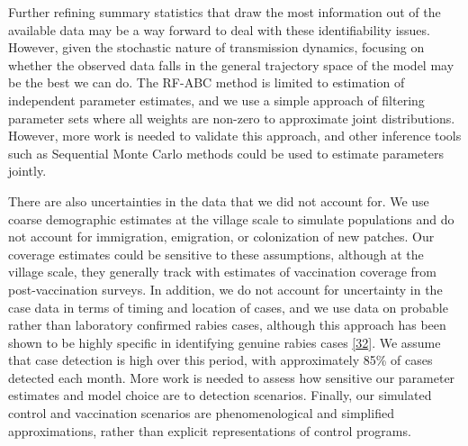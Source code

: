 \documentclass[
  oneside]{book}
\begin{document}
Further refining summary statistics that draw the most information out of the available data may be a way forward to deal with these identifiability issues. However, given the stochastic nature of transmission dynamics, focusing on whether the observed data falls in the general trajectory space of the model may be the best we can do. The RF-ABC method is limited to estimation of independent parameter estimates, and we use a simple approach of filtering parameter sets where all weights are non-zero to approximate joint distributions. However, more work is needed to validate this approach, and other inference tools such as Sequential Monte Carlo methods could be used to estimate parameters jointly.

There are also uncertainties in the data that we did not account for. We use coarse demographic estimates at the village scale to simulate populations and do not account for immigration, emigration, or colonization of new patches. Our coverage estimates could be sensitive to these assumptions, although at the village scale, they generally track with estimates of vaccination coverage from post-vaccination surveys. In addition, we do not account for uncertainty in the case data in terms of timing and location of cases, and we use data on probable rather than laboratory confirmed rabies cases, although this approach has been shown to be highly specific in identifying genuine rabies cases \protect\hyperlink{ref-Hampson2009}{{[}32{]}}. We assume that case detection is high over this period, with approximately 85\% of cases detected each month. More work is needed to assess how sensitive our parameter estimates and model choice are to detection scenarios. Finally, our simulated control and vaccination scenarios are phenomenological and simplified approximations, rather than explicit representations of control programs.
\end{document}
